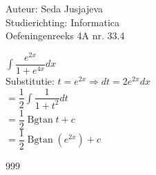 \documentclass[a4paper]{article}
\newcommand{\integral}{\displaystyle\int}
\begin{document}
\noindent \large Auteur: Seda Jusjajeva\\
\noindent \large Studierichting: Informatica\\
\noindent \large Oefeningenreeks 4A nr. 33.4\\

\medskip

\normalsize

$\integral\dfrac{e^{2x}}{1 + e^{4x}}dx$ \\

Substitutie: $ t = e^{2x} \Rightarrow dt = 2e^{2x} dx$ \\

$= \dfrac{1}{2}\integral\dfrac{1}{1 + t^2}dt$ \\

$= \dfrac{1}{2}\operatorname{Bgtan}t + c$ \\

$= \dfrac{1}{2}\operatorname{Bgtan} \left(e^{2x}\right) + c$ \\


\begin{thebibliography}{999}
\end{thebibliography}
\end{document}
